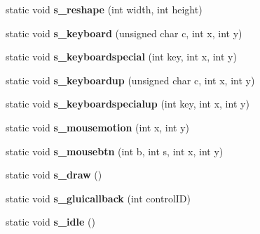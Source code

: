 \begin{DoxyCompactItemize}
\item 
\hypertarget{classBaseGfxApp_a5fe6a77d37044cbe28647ed3391bbb7a}{static void {\bfseries s\-\_\-reshape} (int width, int height)}\label{classBaseGfxApp_a5fe6a77d37044cbe28647ed3391bbb7a}

\item 
\hypertarget{classBaseGfxApp_a52edb2569227319feb68779844e7d857}{static void {\bfseries s\-\_\-keyboard} (unsigned char c, int x, int y)}\label{classBaseGfxApp_a52edb2569227319feb68779844e7d857}

\item 
\hypertarget{classBaseGfxApp_a1e8d90a4faab60300ddf2a4ea9b83115}{static void {\bfseries s\-\_\-keyboardspecial} (int key, int x, int y)}\label{classBaseGfxApp_a1e8d90a4faab60300ddf2a4ea9b83115}

\item 
\hypertarget{classBaseGfxApp_aa1ca205af9d6cee33949f2e6adf4c923}{static void {\bfseries s\-\_\-keyboardup} (unsigned char c, int x, int y)}\label{classBaseGfxApp_aa1ca205af9d6cee33949f2e6adf4c923}

\item 
\hypertarget{classBaseGfxApp_a0e4dfe006f3cc9126c1cc8ad32784f75}{static void {\bfseries s\-\_\-keyboardspecialup} (int key, int x, int y)}\label{classBaseGfxApp_a0e4dfe006f3cc9126c1cc8ad32784f75}

\item 
\hypertarget{classBaseGfxApp_a5e640f2394f7e038d0dd2b469d5c2e24}{static void {\bfseries s\-\_\-mousemotion} (int x, int y)}\label{classBaseGfxApp_a5e640f2394f7e038d0dd2b469d5c2e24}

\item 
\hypertarget{classBaseGfxApp_a22dd953bfb75add9fd0f8f2f8be535c5}{static void {\bfseries s\-\_\-mousebtn} (int b, int s, int x, int y)}\label{classBaseGfxApp_a22dd953bfb75add9fd0f8f2f8be535c5}

\item 
\hypertarget{classBaseGfxApp_a58415c6151a2a80e1fe2eaa9919a4dab}{static void {\bfseries s\-\_\-draw} ()}\label{classBaseGfxApp_a58415c6151a2a80e1fe2eaa9919a4dab}

\item 
\hypertarget{classBaseGfxApp_ad4a963321f1147d68369225ab0c7f32f}{static void {\bfseries s\-\_\-gluicallback} (int control\-I\-D)}\label{classBaseGfxApp_ad4a963321f1147d68369225ab0c7f32f}

\item 
\hypertarget{classBaseGfxApp_a272a9972092bed14572b0cff94415963}{static void {\bfseries s\-\_\-idle} ()}\label{classBaseGfxApp_a272a9972092bed14572b0cff94415963}


\end{DoxyCompactItemize}

